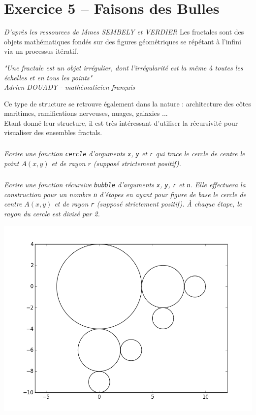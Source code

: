 \section*{Exercice 5 -- Faisons des Bulles}
\setcounter{exo}{0}

\ifprof
\else
\textit{ D'après les ressources de Mmes SEMBELY et VERDIER}
Les fractales sont des objets mathématiques fondés sur des figures géométriques se répétant à l'infini via un processus 
itératif.
\begin{center}
\textit{ "Une fractale est un objet irrégulier, dont l'irrégularité est la même à toutes les échelles et en tous les 
points"
\\
Adrien DOUADY - mathématicien français}
\end{center}
Ce type de structure se retrouve également dans la nature : architecture des côtes maritimes, ramifications nerveuses, 
nuages, galaxies ...
\\
Etant donné leur structure, il est très intéressant d'utiliser la récursivité pour visualiser des ensembles fractals.
\\

\fi

\subparagraph{}
\textit{Ecrire une fonction \texttt{cercle} d'arguments \texttt{x}, \texttt{y} et \texttt{r} qui trace le cercle de 
centre le point $A(x, y)$ et de rayon $r$ (supposé strictement positif).}

\subparagraph{}
\textit{Ecrire une fonction récursive \texttt{bubble} d'arguments \texttt{x}, \texttt{y}, \texttt{r} et \texttt{n}. Elle 
effectuera la construction pour un nombre \texttt{n} d'étapes en ayant pour figure de base le cercle de centre $A(x, y)$ 
et de rayon \texttt{r} (supposé strictement positif).}
\textit{À chaque étape, le rayon du cercle est divisé par 2.}
\begin{center}
\includegraphics[width=.65\linewidth]{images/fig_03}
\end{center}

